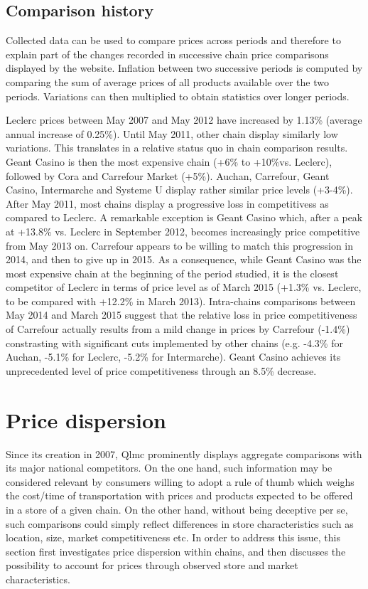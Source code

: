 \documentclass[english]{article}
\begin{document}
\subsection{Comparison history}

Collected data can be used to compare prices across periods and therefore to explain part of the changes recorded in successive chain price comparisons displayed by the website. Inflation between two successive periods is computed by comparing the sum of average prices of all products available over the two periods. Variations can then multiplied to obtain statistics over longer periods.

Leclerc prices between May 2007 and May 2012 have increased by 1.13\% (average annual increase of 0.25\%). Until May 2011, other chain display similarly low variations. This translates in a relative status quo in chain comparison results. Geant Casino is then the most expensive chain (+6\% to +10\%vs. Leclerc), followed by Cora and Carrefour Market (+5\%). Auchan, Carrefour, Geant Casino, Intermarche and Systeme U display rather similar price levels (+3-4\%).
After May 2011, most chains display a progressive loss in competitivess as compared to Leclerc. A remarkable exception is Geant Casino which, after a peak at +13.8\% vs. Leclerc in September 2012, becomes increasingly price competitive from May 2013 on. Carrefour appears to be willing to match this progression in 2014, and then to give up in 2015. As a consequence, while Geant Casino was the most expensive chain at the beginning of the period studied, it is the closest competitor of Leclerc in terms of price level as of March 2015 (+1.3\% vs. Leclerc, to be compared with +12.2\% in March 2013).
Intra-chains comparisons between May 2014 and March 2015 suggest that the relative loss in price competitiveness of Carrefour actually results from a mild change in prices by Carrefour (-1.4\%) constrasting with significant cuts implemented by other chains (e.g. -4.3\% for Auchan, -5.1\% for Leclerc, -5.2\% for Intermarche). Geant Casino achieves its unprecedented level of price competitiveness through an 8.5\% decrease.

\section{Price dispersion}

Since its creation in 2007, Qlmc prominently displays aggregate comparisons with its major national competitors. On the one hand, such information may be considered relevant by consumers willing to adopt a rule of thumb which weighs the cost/time of transportation with prices and products expected to be offered in a store of a given chain. On the other hand, without being deceptive per se, such comparisons could simply reflect differences in store characteristics such as location, size, market competitiveness etc. In order to address this issue, this section first investigates price dispersion within chains, and then discusses the possibility to account for prices through observed store and market characteristics.
\end{document}
